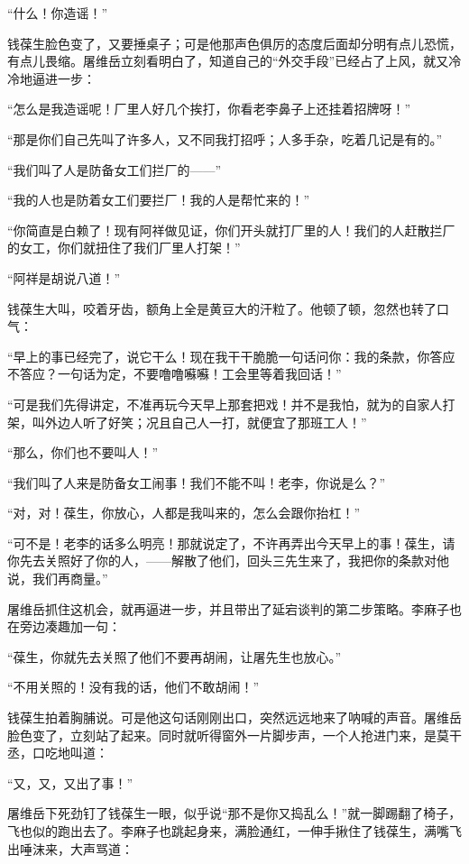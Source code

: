 \par “什么！你造谣！”
\par 钱葆生脸色变了，又要捶桌子；可是他那声色俱厉的态度后面却分明有点儿恐慌，有点儿畏缩。屠维岳立刻看明白了，知道自己的“外交手段”已经占了上风，就又冷冷地逼进一步：
\par “怎么是我造谣呢！厂里人好几个挨打，你看老李鼻子上还挂着招牌呀！”
\par “那是你们自己先叫了许多人，又不同我打招呼；人多手杂，吃着几记是有的。”
\par “我们叫了人是防备女工们拦厂的——”
\par “我的人也是防着女工们要拦厂！我的人是帮忙来的！”
\par “你简直是白赖了！现有阿祥做见证，你们开头就打厂里的人！我们的人赶散拦厂的女工，你们就扭住了我们厂里人打架！”
\par “阿祥是胡说八道！”
\par 钱葆生大叫，咬着牙齿，额角上全是黄豆大的汗粒了。他顿了顿，忽然也转了口气：
\par “早上的事已经完了，说它干么！现在我干干脆脆一句话问你：我的条款，你答应不答应？一句话为定，不要噜噜囌囌！工会里等着我回话！”
\par “可是我们先得讲定，不准再玩今天早上那套把戏！并不是我怕，就为的自家人打架，叫外边人听了好笑；况且自己人一打，就便宜了那班工人！”
\par “那么，你们也不要叫人！”
\par “我们叫了人来是防备女工闹事！我们不能不叫！老李，你说是么？”
\par “对，对！葆生，你放心，人都是我叫来的，怎么会跟你抬杠！”
\par “可不是！老李的话多么明亮！那就说定了，不许再弄出今天早上的事！葆生，请你先去关照好了你的人，——解散了他们，回头三先生来了，我把你的条款对他说，我们再商量。”
\par 屠维岳抓住这机会，就再逼进一步，并且带出了延宕谈判的第二步策略。李麻子也在旁边凑趣加一句：
\par “葆生，你就先去关照了他们不要再胡闹，让屠先生也放心。”
\par “不用关照的！没有我的话，他们不敢胡闹！”
\par 钱葆生拍着胸脯说。可是他这句话刚刚出口，突然远远地来了呐喊的声音。屠维岳脸色变了，立刻站了起来。同时就听得窗外一片脚步声，一个人抢进门来，是莫干丞，口吃地叫道：
\par “又，又，又出了事！”
\par 屠维岳下死劲钉了钱葆生一眼，似乎说“那不是你又捣乱么！”就一脚踢翻了椅子，飞也似的跑出去了。李麻子也跳起身来，满脸通红，一伸手揪住了钱葆生，满嘴飞出唾沫来，大声骂道：
